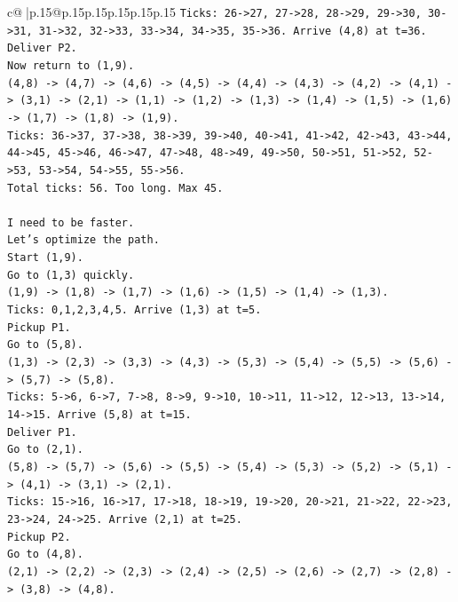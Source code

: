\documentclass{article}
\begin{document}
{\begin{supertabular}{c@{$\;$}|p{.15\linewidth}@{}p{.15\linewidth}p{.15\linewidth}p{.15\linewidth}p{.15\linewidth}p{.15\linewidth}}
{{{\texttt{Ticks: 26{-}>27, 27{-}>28, 28{-}>29, 29{-}>30, 30{-}>31, 31{-}>32, 32{-}>33, 33{-}>34, 34{-}>35, 35{-}>36. Arrive (4,8) at t=36.} \\
\texttt{Deliver P2.} \\
\texttt{Now return to (1,9).} \\
\texttt{(4,8) {-}> (4,7) {-}> (4,6) {-}> (4,5) {-}> (4,4) {-}> (4,3) {-}> (4,2) {-}> (4,1) {-}> (3,1) {-}> (2,1) {-}> (1,1) {-}> (1,2) {-}> (1,3) {-}> (1,4) {-}> (1,5) {-}> (1,6) {-}> (1,7) {-}> (1,8) {-}> (1,9).} \\
\texttt{Ticks: 36{-}>37, 37{-}>38, 38{-}>39, 39{-}>40, 40{-}>41, 41{-}>42, 42{-}>43, 43{-}>44, 44{-}>45, 45{-}>46, 46{-}>47, 47{-}>48, 48{-}>49, 49{-}>50, 50{-}>51, 51{-}>52, 52{-}>53, 53{-}>54, 54{-}>55, 55{-}>56.} \\
\texttt{Total ticks: 56. Too long. Max 45.} \\
\\ 
\texttt{I need to be faster.} \\
\texttt{Let's optimize the path.} \\
\texttt{Start (1,9).} \\
\texttt{Go to (1,3) quickly.} \\
\texttt{(1,9) {-}> (1,8) {-}> (1,7) {-}> (1,6) {-}> (1,5) {-}> (1,4) {-}> (1,3).} \\
\texttt{Ticks: 0,1,2,3,4,5. Arrive (1,3) at t=5.} \\
\texttt{Pickup P1.} \\
\texttt{Go to (5,8).} \\
\texttt{(1,3) {-}> (2,3) {-}> (3,3) {-}> (4,3) {-}> (5,3) {-}> (5,4) {-}> (5,5) {-}> (5,6) {-}> (5,7) {-}> (5,8).} \\
\texttt{Ticks: 5{-}>6, 6{-}>7, 7{-}>8, 8{-}>9, 9{-}>10, 10{-}>11, 11{-}>12, 12{-}>13, 13{-}>14, 14{-}>15. Arrive (5,8) at t=15.} \\
\texttt{Deliver P1.} \\
\texttt{Go to (2,1).} \\
\texttt{(5,8) {-}> (5,7) {-}> (5,6) {-}> (5,5) {-}> (5,4) {-}> (5,3) {-}> (5,2) {-}> (5,1) {-}> (4,1) {-}> (3,1) {-}> (2,1).} \\
\texttt{Ticks: 15{-}>16, 16{-}>17, 17{-}>18, 18{-}>19, 19{-}>20, 20{-}>21, 21{-}>22, 22{-}>23, 23{-}>24, 24{-}>25. Arrive (2,1) at t=25.} \\
\texttt{Pickup P2.} \\
\texttt{Go to (4,8).} \\
\texttt{(2,1) {-}> (2,2) {-}> (2,3) {-}> (2,4) {-}> (2,5) {-}> (2,6) {-}> (2,7) {-}> (2,8) {-}> (3,8) {-}> (4,8).} \\
}}}
\end{supertabular}}
\end{document}
